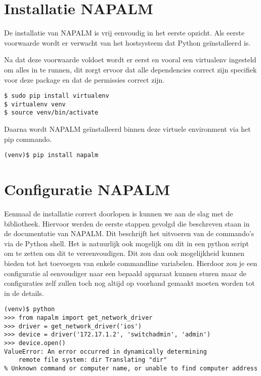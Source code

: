 \section{Installatie NAPALM}
\label{ch:napalminstallation}
De installatie van NAPALM is vrij eenvoudig in het eerste opzicht. Als eerste voorwaarde wordt er verwacht van het hostsysteem dat Python geïnstalleerd is. 

Na dat deze voorwaarde voldoet wordt er eerst en vooral een virtualenv ingesteld om alles in te runnen, dit zorgt ervoor dat alle dependencies correct zijn specifiek voor deze package en dat de permissies correct zijn. \autocite{virtualEnvs}

\begin{center}
\begin{Verbatim}
$ sudo pip install virtualenv
$ virtualenv venv
$ source venv/bin/activate
\end{Verbatim}
\end{center}

Daarna wordt NAPALM geïnstalleerd binnen deze virtuele environment via het pip commando.
\begin{center}
\begin{Verbatim}
(venv)$ pip install napalm
\end{Verbatim}
\end{center}

\section{Configuratie NAPALM}
\label{ch:napalmconfiguration}

Eenmaal de installatie correct doorlopen is kunnen we aan de slag met de bibliotheek. Hiervoor werden de eerste stappen gevolgd die beschreven staan in de documentatie van NAPALM. Dit beschrijft het uitvoeren van de commando's via de Python shell. Het is natuurlijk ook mogelijk om dit in een python script om te zetten om dit te vereenvoudigen. Dit zou dan ook mogelijkheid kunnen bieden tot het toevoegen van enkele commandline variabelen. Hierdoor zou je een configuratie al eenvoudiger naar een bepaald apparaat kunnen sturen maar de configuraties zelf zullen toch nog altijd op voorhand gemaakt moeten worden tot in de details. \autocite{napalmFirstSteps}

\begin{center}
\begin{Verbatim}
(venv)$ python
>>> from napalm import get_network_driver
>>> driver = get_network_driver('ios')
>>> device = driver('172.17.1.2', 'switchadmin', 'admin')
>>> device.open()
ValueError: An error occurred in dynamically determining
    remote file system: dir Translating "dir"
% Unknown command or computer name, or unable to find computer address
\end{Verbatim}
\end{center}

